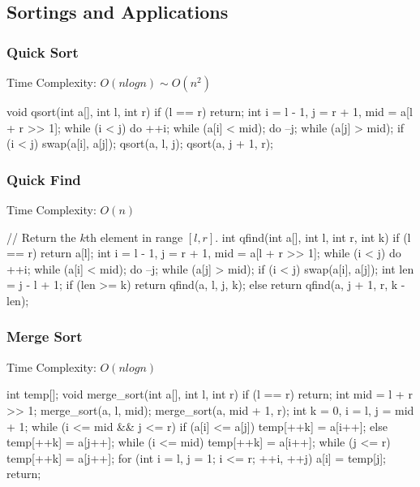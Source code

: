 \subsection{Sortings and Applications}
\subsubsection{Quick Sort}
Time Complexity: $O(nlogn) \sim O(n^2)$
\begin{cppcode}
void qsort(int a[], int l, int r)
{
    if (l == r) return;
    int i = l - 1, j = r + 1, mid = a[l + r >> 1];
    while (i < j)
    {
        do ++i; while (a[i] < mid);
        do --j; while (a[j] > mid);
        if (i < j) swap(a[i], a[j]);
    }
    qsort(a, l, j); qsort(a, j + 1, r);
}
\end{cppcode}

\subsubsection{Quick Find}
Time Complexity: $O(n)$
\begin{cppcode}
// Return the $k$th element in range $[l, r]$.
int qfind(int a[], int l, int r, int k)
{
    if (l == r) return a[l];
    int i = l - 1, j = r + 1, mid = a[l + r >> 1];
    while (i < j)
    {
        do ++i; while (a[i] < mid);
        do --j; while (a[j] > mid);
        if (i < j) swap(a[i], a[j]);
    }
    int len = j - l + 1;
    if (len >= k) return qfind(a, l, j, k);
    else return qfind(a, j + 1, r, k - len);
}
\end{cppcode}

\subsubsection{Merge Sort}
Time Complexity: $O(nlogn)$
\begin{cppcode}
int temp[];
void merge_sort(int a[], int l, int r)
{
    if (l == r) return;
    int mid = l + r >> 1;
    merge_sort(a, l, mid); merge_sort(a, mid + 1, r);
    int k = 0, i = l, j = mid + 1;
    while (i <= mid && j <= r)
    {
        if (a[i] <= a[j]) temp[++k] = a[i++];
        else temp[++k] = a[j++];
    }
    while (i <= mid) temp[++k] = a[i++];
    while (j <= r) temp[++k] = a[j++];
    for (int i = l, j = 1; i <= r; ++i, ++j) a[i] = temp[j];
    return;
}
\end{cppcode}


